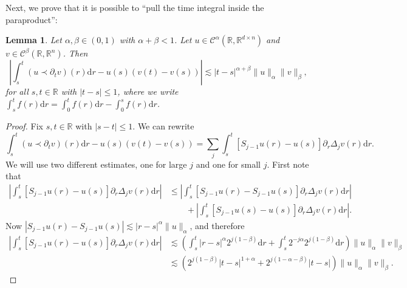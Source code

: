 \documentclass[11pt,a4paper]{article}
\newcommand{\mathd}{\mathrm{d}}
\newtheorem{lemma}[theorem]{Lemma}
\theoremstyle{remark}
\newcommand{\R}{\mathbb{R}}
\newcommand{\CC}{\ensuremath{\mathscr{C}}}
\begin{document}
Next, we prove that it is possible to ``pull the time integral inside the paraproduct'':

\begin{lemma}\label{lemma:controlled old and new}
  Let $\alpha , \beta \in ( 0,1 )$ with $\alpha + \beta <1$. Let $u \in \CC^\alpha(\R, \R^{d \times n})$ and $v \in \CC^{\beta}(\R, \R^n)$. Then
  \[
     \left| \int_{s}^{t} ( u \prec \partial_{t} v ) ( r ) \mathd r-u ( s ) ( v ( t ) -v ( s ) ) \right| \lesssim | t-s |^{\alpha + \beta} \| u  \|_{\alpha} \| v \|_{\beta} ,
  \]
  for all $s,t \in \mathbb{R}$ with $| t-s | \leqslant 1$, where we write $\int_{s}^{t} f ( r ) \mathd r= \int_{0}^{t} f ( r ) \mathd r- \int_{0}^{s} f ( r ) \mathd r$.
\end{lemma}

\begin{proof}
  Fix $s,t \in \mathbb{R}$ with $| s-t | \leqslant 1$. We can rewrite
  \[
     \int_{s}^{t} ( u \prec \partial_{t} v ) ( r ) \mathd r-u ( s ) ( v ( t ) -v ( s ) ) = \sum_{j} \int_{s}^{t} [ S_{j-1} u ( r ) -u ( s ) ] \partial_{r} \Delta_{j} v ( r ) \mathd r.
  \]
  We will use two different estimates, one for large $j$ and one for small $j$. First note that
  \begin{align*}
     \left| \int_{s}^{t} [ S_{j-1} u ( r ) -u ( s ) ] \partial_{r} \Delta_{j} v ( r ) \mathd r \right| & \leqslant \left| \int_{s}^{t} [ S_{j-1} u ( r ) -S_{j-1} u ( s ) ]  \partial_{r} \Delta_{j} v ( r ) \mathd r \right| \\
     &\qquad + \left| \int_{s}^{t} [ S_{j-1} u ( s ) -u ( s ) ] \partial_{r} \Delta_{j} v ( r ) \mathd r  \right| .
  \end{align*}
  Now $| S_{j-1} u ( r ) - S_{j-1} u ( s ) | \lesssim | r-s |^\alpha \| u \|_{\alpha}$, %
  and therefore
  \begin{align}\label{eq:controlled old and new pr1} \nonumber
     \left| \int_{s}^{t} [ S_{j-1} u ( r ) -u ( s ) ] \partial_{r} \Delta_{j} v ( r ) \mathd r \right| &\lesssim \left( \int_{s}^{t}  | r-s |^\alpha 2^{j ( 1- \beta )} \mathd r+ \int_{s}^{t} 2^{-j \alpha} 2^{j ( 1- \beta )} \mathd r \right)\! \| u \|_{\alpha} \| v \|_{\beta} \\
    & \lesssim ( 2^{j ( 1- \beta)} | t-s |^{1+\alpha} +2^{j ( 1- \alpha - \beta )} | t-s | ) \| u \|_{\alpha} \| v \|_{\beta} .

\end{align}
\end{proof}
\end{document}
